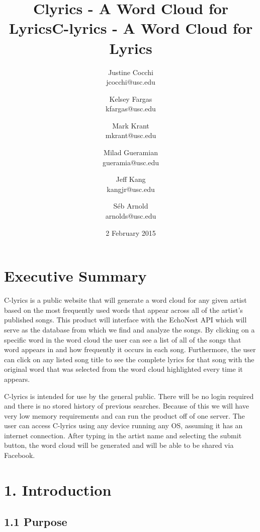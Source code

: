 \documentclass[]{article}
\title{Clyrics - A Word Cloud for Lyrics}
\author{Justine Cocchi\\jcocchi@usc.edu \and Kelsey Fargas\\kfargas@usc.edu \and Mark Krant \\ mkrant@usc.edu\and Milad Gueramian\\gueramia@usc.edu \and Jeff Kang\\kangjr@usc.edu \and Séb Arnold\\arnolds@usc.edu}
\date{2 February 2015}
\title{C-lyrics - A Word Cloud for Lyrics}
\begin{document}
\maketitle

\pagebreak

\tableofcontents
\setcounter{tocdepth}{3}

\pagebreak

\section{Executive Summary}\label{executive-summary}

C-lyrics is a public website that will generate a word cloud for any
given artist based on the most frequently used words that appear across
all of the artist's published songs. This product will interface with
the EchoNest API which will serve as the database from which we find and
analyze the songs. By clicking on a specific word in the word cloud the
user can see a list of all of the songs that word appears in and how
frequently it occurs in each song. Furthermore, the user can click on
any listed song title to see the complete lyrics for that song with the
original word that was selected from the word cloud highlighted every
time it appears.

C-lyrics is intended for use by the general public. There will be no
login required and there is no stored history of previous searches.
Because of this we will have very low memory requirements and can run
the product off of one server. The user can access C-lyrics using any
device running any OS, assuming it has an internet connection. After
typing in the artist name and selecting the submit button, the word
cloud will be generated and will be able to be shared via Facebook.

\pagebreak

\section{1. Introduction}\label{introduction}

\subsection{1.1 Purpose}\label{purpose}
\end{document}
